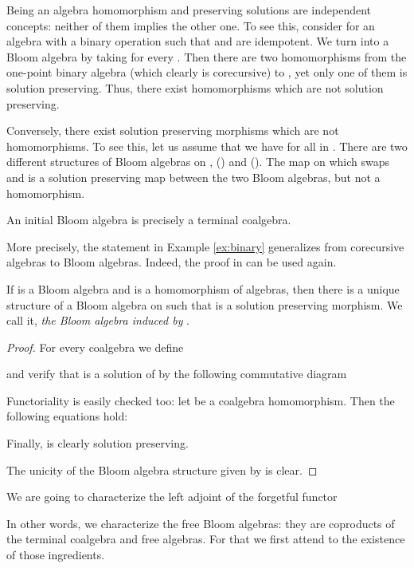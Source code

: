\documentclass{LMCS}
\theoremstyle{plain}
\theoremstyle{definition}
\numberwithin{equation}{section}
\begin{document}
\begin{rem}\label{final B=final coalg}
  Being an algebra homomorphism and preserving solutions are
  independent concepts: neither of them implies the other one. To see
  this, consider for  an algebra  with a
  binary operation  such that  and  are idempotent. We turn
   into a Bloom algebra by taking  for
  every . Then there are two homomorphisms
  from the one-point binary algebra (which clearly is corecursive) to
  , yet only one of them is solution preserving. Thus, there exist
  homomorphisms which are not solution preserving. 

  Conversely, there
  exist solution preserving morphisms which are not homomorphisms. To
  see this, let us assume that we have  for all  in
  . There are two different structures of Bloom algebras on ,
  () and (). The map on  which swaps  and  is a
  solution preserving map between the two Bloom algebras, but not a
  homomorphism.

\end{rem}
 \begin{prop}\label{3x}
 An initial Bloom algebra is precisely a terminal coalgebra.
   \end{prop}
More precisely, the statement in Example \ref{ex:binary} generalizes from corecursive algebras to Bloom algebras.
Indeed, the proof in \cite{cuv2} can be used again.
\begin{lem}\label{A is B then B is B}
If  is a Bloom algebra and  is a homomorphism of algebras, then there is a unique structure of a Bloom algebra on  such that  is a solution preserving morphism. We call it, \emph{the Bloom algebra induced by} .
\end{lem}

\begin{proof}
For every coalgebra  we define


and verify that  is a solution of  by the following commutative diagram
 
Functoriality is easily checked too:
let  be a coalgebra homomorphism. Then the following equations hold:

Finally,  is clearly solution preserving.

The unicity of the Bloom algebra structure given by  is clear.
\end{proof}

\begin{rem}
 We are going to characterize the left adjoint of the forgetful functor

In other words, we characterize the free Bloom algebras: they are
coproducts  of the terminal coalgebra and free algebras. For that we first attend to the existence of those ingredients.
\end{rem}
\end{document}
